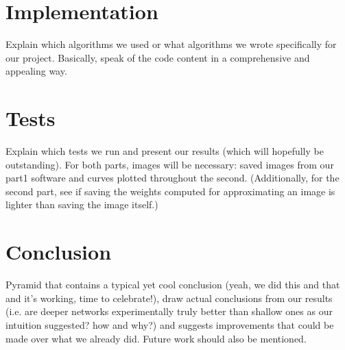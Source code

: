 \documentclass[a4paper]{article}
\begin{document}
\section{Implementation}
Explain which algorithms we used or what algorithms we wrote specifically for our project. Basically, speak of the code content in a comprehensive and appealing way.

\section{Tests}
Explain which tests we run and present our results (which will hopefully be outstanding). For both parts, images will be necessary: saved images from our part1 software and curves plotted throughout the second. (Additionally, for the second part, see if saving the weights computed for approximating an image is lighter than saving the image itself.)


\section{Conclusion}
Pyramid that contains a typical yet cool conclusion (yeah, we did this and that and it's working, time to celebrate!), draw actual conclusions from our results (i.e. are deeper networks experimentally truly better than shallow ones as our intuition suggested? how and why?) and suggests improvements that could be made over what we already did. Future work should also be mentioned.



\end{document}
